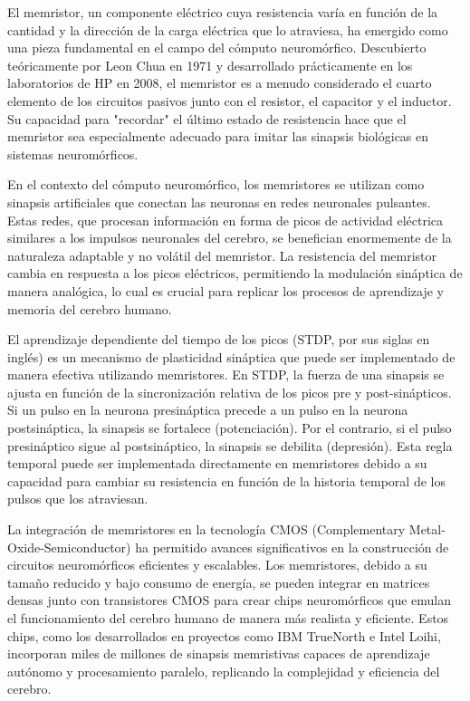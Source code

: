\documentclass[conference]{IEEEtran}
\begin{document}
El memristor, un componente eléctrico cuya resistencia varía en función de la cantidad y la dirección de la carga eléctrica que lo atraviesa, ha emergido como una pieza fundamental en el campo del cómputo neuromórfico. Descubierto teóricamente por Leon Chua en 1971 y desarrollado prácticamente en los laboratorios de HP en 2008, el memristor es a menudo considerado el cuarto elemento de los circuitos pasivos junto con el resistor, el capacitor y el inductor. Su capacidad para "recordar" el último estado de resistencia hace que el memristor sea especialmente adecuado para imitar las sinapsis biológicas en sistemas neuromórficos.

En el contexto del cómputo neuromórfico, los memristores se utilizan como sinapsis artificiales que conectan las neuronas en redes neuronales pulsantes. Estas redes, que procesan información en forma de picos de actividad eléctrica similares a los impulsos neuronales del cerebro, se benefician enormemente de la naturaleza adaptable y no volátil del memristor. La resistencia del memristor cambia en respuesta a los picos eléctricos, permitiendo la modulación sináptica de manera analógica, lo cual es crucial para replicar los procesos de aprendizaje y memoria del cerebro humano.

El aprendizaje dependiente del tiempo de los picos (STDP, por sus siglas en inglés) es un mecanismo de plasticidad sináptica que puede ser implementado de manera efectiva utilizando memristores. En STDP, la fuerza de una sinapsis se ajusta en función de la sincronización relativa de los picos pre y post-sinápticos. Si un pulso en la neurona presináptica precede a un pulso en la neurona postsináptica, la sinapsis se fortalece (potenciación). Por el contrario, si el pulso presináptico sigue al postsináptico, la sinapsis se debilita (depresión). Esta regla temporal puede ser implementada directamente en memristores debido a su capacidad para cambiar su resistencia en función de la historia temporal de los pulsos que los atraviesan.

La integración de memristores en la tecnología CMOS (Complementary Metal-Oxide-Semiconductor) ha permitido avances significativos en la construcción de circuitos neuromórficos eficientes y escalables. Los memristores, debido a su tamaño reducido y bajo consumo de energía, se pueden integrar en matrices densas junto con transistores CMOS para crear chips neuromórficos que emulan el funcionamiento del cerebro humano de manera más realista y eficiente. Estos chips, como los desarrollados en proyectos como IBM TrueNorth e Intel Loihi, incorporan miles de millones de sinapsis memristivas capaces de aprendizaje autónomo y procesamiento paralelo, replicando la complejidad y eficiencia del cerebro.
\end{document}
